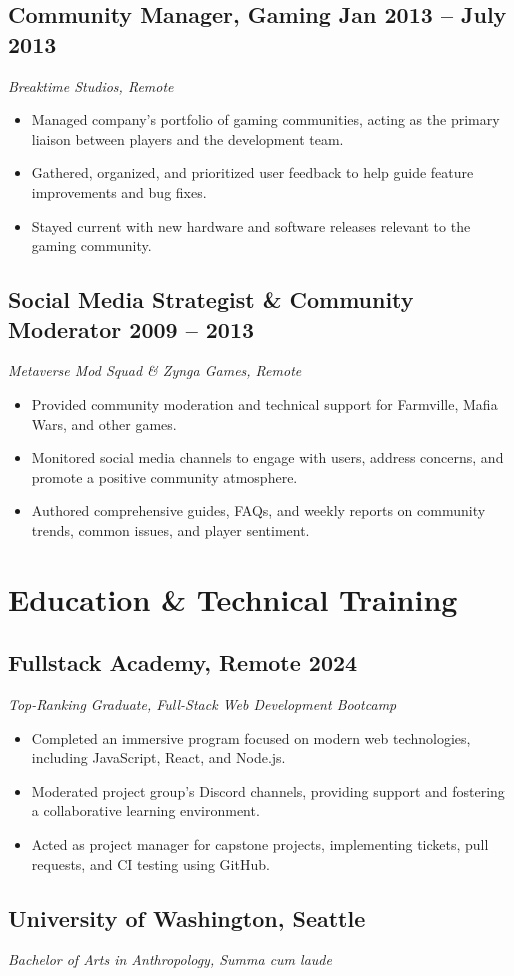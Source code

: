 \documentclass[a4paper,12pt]{article} %
\begin{document}
\subsection{Community Manager, Gaming \hfill Jan 2013 – July 2013}
\textit{Breaktime Studios, Remote}
\begin{itemize}
    \item Managed company's portfolio of gaming communities, acting as the primary liaison between players and the development team.
    \item Gathered, organized, and prioritized user feedback to help guide feature improvements and bug fixes.
    \item Stayed current with new hardware and software releases relevant to the gaming community.
\end{itemize}

\subsection{Social Media Strategist \& Community Moderator \hfill 2009 – 2013}
\textit{Metaverse Mod Squad \& Zynga Games, Remote}
\begin{itemize}
    \item Provided community moderation and technical support for Farmville, Mafia Wars, and other games.
    \item Monitored social media channels to engage with users, address concerns, and promote a positive community atmosphere.
    \item Authored comprehensive guides, FAQs, and weekly reports on community trends, common issues, and player sentiment.
\end{itemize}

\section{Education \& Technical Training}
\subsection{Fullstack Academy, Remote \hfill 2024}
\textit{Top-Ranking Graduate, Full-Stack Web Development Bootcamp}
\begin{itemize}
    \item Completed an immersive program focused on modern web technologies, including JavaScript, React, and Node.js.
    \item Moderated project group's Discord channels, providing support and fostering a collaborative learning environment.
    \item Acted as project manager for capstone projects, implementing tickets, pull requests, and CI testing using GitHub.
\end{itemize}

\subsection{University of Washington, Seattle \hfill}
\textit{Bachelor of Arts in Anthropology, Summa cum laude}
\end{document}
